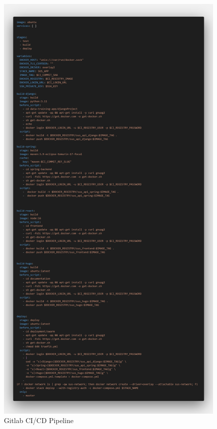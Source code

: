 \begin{figure}[ht]
\begin{minipage}{0.5\textwidth}
        \includegraphics[width=\textwidth,height=\textheight,keepaspectratio]{includes/figures/code/gitlab_ci.png}
        \caption{Gitlab CI/CD Pipeline}
        \label{fig:gitlab_ci_pipeline}
    \end{minipage}
\end{figure}
